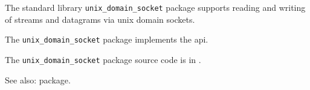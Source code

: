 
The standard library {\tt unix\_domain\_socket} package supports reading and writing 
of streams and datagrams via unix domain sockets.

The {\tt unix\_domain\_socket} package implements the  api.

The {\tt unix\_domain\_socket} package source code is in .

See also:  package.
